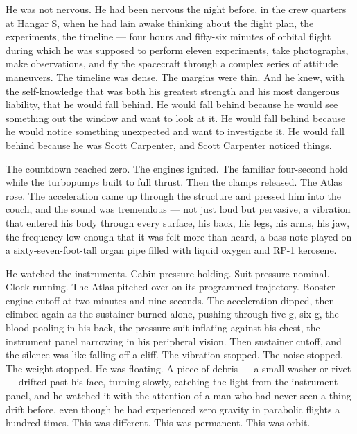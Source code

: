 \documentclass[12pt, letterpaper]{article}
\begin{document}
He was not nervous. He had been nervous the night before, in the crew quarters at Hangar S, when he had lain awake thinking about the flight plan, the experiments, the timeline --- four hours and fifty-six minutes of orbital flight during which he was supposed to perform eleven experiments, take photographs, make observations, and fly the spacecraft through a complex series of attitude maneuvers. The timeline was dense. The margins were thin. And he knew, with the self-knowledge that was both his greatest strength and his most dangerous liability, that he would fall behind. He would fall behind because he would see something out the window and want to look at it. He would fall behind because he would notice something unexpected and want to investigate it. He would fall behind because he was Scott Carpenter, and Scott Carpenter noticed things.

The countdown reached zero. The engines ignited. The familiar four-second hold while the turbopumps built to full thrust. Then the clamps released. The Atlas rose. The acceleration came up through the structure and pressed him into the couch, and the sound was tremendous --- not just loud but pervasive, a vibration that entered his body through every surface, his back, his legs, his arms, his jaw, the frequency low enough that it was felt more than heard, a bass note played on a sixty-seven-foot-tall organ pipe filled with liquid oxygen and RP-1 kerosene.

He watched the instruments. Cabin pressure holding. Suit pressure nominal. Clock running. The Atlas pitched over on its programmed trajectory. Booster engine cutoff at two minutes and nine seconds. The acceleration dipped, then climbed again as the sustainer burned alone, pushing through five g, six g, the blood pooling in his back, the pressure suit inflating against his chest, the instrument panel narrowing in his peripheral vision. Then sustainer cutoff, and the silence was like falling off a cliff. The vibration stopped. The noise stopped. The weight stopped. He was floating. A piece of debris --- a small washer or rivet --- drifted past his face, turning slowly, catching the light from the instrument panel, and he watched it with the attention of a man who had never seen a thing drift before, even though he had experienced zero gravity in parabolic flights a hundred times. This was different. This was permanent. This was orbit.
\end{document}
